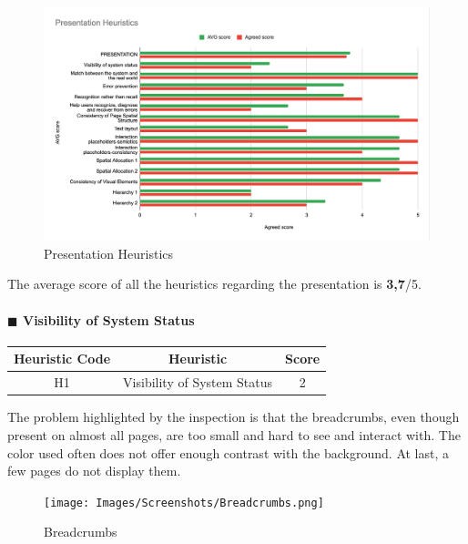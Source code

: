 \documentclass[11pt]{article} %
\begin{document}
\begin{figure}[H]
  \centering
  \includegraphics[width=\textwidth]{Images/Presentation Heuristics.png}
  \caption{Presentation Heuristics}
\end{figure}
The average score of all the heuristics regarding the presentation is \textbf{3,7}/5.


\paragraph{$\blacksquare$ Visibility of System Status}
\begin{center}
    \begin{tabular}{|c|c|c|}
    \hline
    \textbf{Heuristic Code} & \textbf{Heuristic} & \textbf{Score}\\ 
    \hline
    H1 & Visibility of System Status & 2 \\
    \hline
    \end{tabular}
\end{center}
The problem highlighted by the inspection is that the breadcrumbs, even though present on almost all pages, are too small and hard to see and interact with. The color used often does not offer enough contrast with the background. At last, a few pages do not display them.

\begin{figure}[H]
  \centering
  \texttt{[image: Images/Screenshots/Breadcrumbs.png]}
  \caption{Breadcrumbs}
\end{figure}
\end{document}
